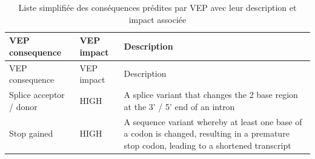 \documentclass[12pt,twoside]{reedthesis}
\theoremstyle{definition}
\theoremstyle{definition}
\theoremstyle{remark}
\begin{document}
  \begin{longtable}[]{@{}lll@{}}
  \caption{\label{tab:tabvepcsq} Liste simplifiée des conséquences prédites
  par VEP avec leur description et impact associée}\tabularnewline
  \toprule
  \begin{minipage}[b]{0.18\columnwidth}\raggedright\strut
  VEP consequence\strut
  \end{minipage} & \begin{minipage}[b]{0.11\columnwidth}\raggedright\strut
  VEP impact\strut
  \end{minipage} & \begin{minipage}[b]{0.63\columnwidth}\raggedright\strut
  Description\strut
  \end{minipage}\tabularnewline
  \midrule
  \endfirsthead
  \toprule
  \begin{minipage}[b]{0.18\columnwidth}\raggedright\strut
  VEP consequence\strut
  \end{minipage} & \begin{minipage}[b]{0.11\columnwidth}\raggedright\strut
  VEP impact\strut
  \end{minipage} & \begin{minipage}[b]{0.63\columnwidth}\raggedright\strut
  Description\strut
  \end{minipage}\tabularnewline
  \midrule
  \endhead
  \begin{minipage}[t]{0.18\columnwidth}\raggedright\strut
  Splice acceptor / donor\strut
  \end{minipage} & \begin{minipage}[t]{0.11\columnwidth}\raggedright\strut
  HIGH\strut
  \end{minipage} & \begin{minipage}[t]{0.63\columnwidth}\raggedright\strut
  A splice variant that changes the 2 base region at the 3' / 5' end of an
  intron\strut
  \end{minipage}\tabularnewline
  \begin{minipage}[t]{0.18\columnwidth}\raggedright\strut
  Stop gained\strut
  \end{minipage} & \begin{minipage}[t]{0.11\columnwidth}\raggedright\strut
  HIGH\strut
  \end{minipage} & \begin{minipage}[t]{0.63\columnwidth}\raggedright\strut
  A sequence variant whereby at least one base of a codon is changed,
  resulting in a premature stop codon, leading to a shortened
  transcript\strut
  \end{minipage}\tabularnewline

\end{longtable}
\end{document}
